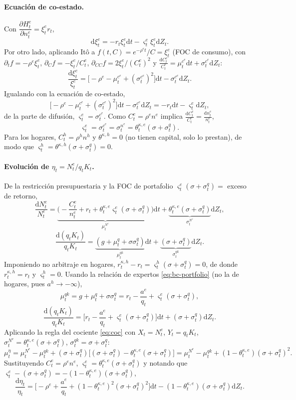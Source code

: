 \documentclass[11pt]{article}
\theoremstyle{definition}
\theoremstyle{remark}
\newcommand{\dd}{\mathrm{d}}
\newcommand{\aE}{a^{e}}
\newcommand{\aH}{a^{h}}
\newcommand{\re}{\rho^{e}}
\newcommand{\rh}{\rho^{h}}
\newcommand{\thke}{\theta_t^{\kappa,e}}
\newcommand{\vsig}{\varsigma}
\newcommand{\sq}{\sigma_t^{q}}
\begin{document}
\paragraph{Ecuación de co-estado.} Con $\dfrac{\partial H_t^{e}}{\partial n_t^{e}}=\xi_t^{e}r_t$,
\[
\dd\xi_t^{e}=-r_t\xi_t^{e}\dd t-\vsig_t^{e}\xi_t^{e}\dd Z_t.
\]
Por otro lado, aplicando Itô a $f(t,C)=e^{-\re t}/C=\xi_t^{e}$ (FOC de consumo), con
$\partial_tf=-\re\xi_t^{e}$, $\partial_Cf=-\xi_t^{e}/C_t^{e}$, $\partial_{CC}f=2\xi_t^{e}/(C_t^{e})^2$ y $\tfrac{\dd C_t^{e}}{C_t^{e}}=\mu_t^{c^{e}}\dd t+\sigma_t^{c^{e}}\dd Z_t$:
\[
\frac{\dd\xi_t^{e}}{\xi_t^{e}}=\big[-\re-\mu_t^{c^{e}}+(\sigma_t^{c^{e}})^2\big]\dd t-\sigma_t^{c^{e}}\dd Z_t.
\]
Igualando con la ecuación de co-estado,
\[
\big[-\re-\mu_t^{c^{e}}+(\sigma_t^{c^{e}})^2\big]\dd t-\sigma_t^{c^{e}}\dd Z_t=-r_t\dd t-\vsig_t^{e}\dd Z_t,
\]
de la parte de difusión, $\vsig_t^{e}=\sigma_t^{c^{e}}$. Como $C_t^{e}=\re n^{e}$ implica $\tfrac{\dd C_t^{e}}{C_t^{e}}=\tfrac{\dd n_t^{e}}{n_t^{e}}$,
\begin{equation}\label{eq:bc-price-risk}
\vsig_t^{e}=\sigma_t^{c^{e}}=\sigma_t^{n^{e}}=\thke(\sigma+\sq).
\end{equation}
Para los hogares, $C_t^{h}=\rh n^{h}$ y $\theta^{\kappa,h}=0$ (no tienen capital, solo lo prestan), de modo que $\vsig_t^{h}=\theta^{\kappa,h}(\sigma+\sq)=0$.

\paragraph{Evolución de $\eta_t=N_t^{e}/q_tK_t$.} De la restricción presupuestaria y la FOC de portafolio $\vsig_t^{e}(\sigma+\sq)=$ exceso de retorno,
\[
\frac{\dd N_t^{e}}{N_t^{e}}=\underbrace{\Big(-\frac{C_t^{e}}{n_t^{e}}+r_t+\thke\vsig_t^{e}(\sigma+\sq)\Big)}_{\mu_t^{N^{e}}}\dd t+\underbrace{\thke(\sigma+\sq)}_{\sigma_t^{N^{e}}}\dd Z_t,
\]
\[
\frac{\dd(q_tK_t)}{q_tK_t}=\underbrace{(g+\mu_t^{q}+\sigma\sq)}_{\mu_t^{qk}}\dd t+\underbrace{(\sigma+\sq)}_{\sigma_t^{qk}}\dd Z_t.
\]
Imponiendo no arbitraje en hogares, $r_t^{\kappa,h}-r_t=\vsig_t^{h}(\sigma+\sq)=0$, de donde $r_t^{\kappa,h}=r_t$ y $\vsig_t^{h}=0$. Usando la relación de expertos \eqref{eq:bc-portfolio} (no la de hogares, pues $\aH\to-\infty$),
\[
\mu_t^{qk}=g+\mu_t^{q}+\sigma\sq=r_t-\frac{\aE}{q_t}+\vsig_t^{e}(\sigma+\sq),
\]
\[
\frac{\dd(q_tK_t)}{q_tK_t}=\Big[r_t-\frac{\aE}{q_t}+\vsig_t^{e}(\sigma+\sq)\Big]\dd t+(\sigma+\sq)\dd Z_t.
\]
Aplicando la regla del cociente \eqref{eq:coc} con $X_t=N_t^{e}$, $Y_t=q_tK_t$, $\sigma_t^{N^{e}}=\thke(\sigma+\sq)$, $\sigma_t^{qk}=\sigma+\sq$:
\[
\mu_t^{\eta}=\mu_t^{N^{e}}-\mu_t^{qk}+(\sigma+\sq)\big[(\sigma+\sq)-\thke(\sigma+\sq)\big]
=\mu_t^{N^{e}}-\mu_t^{qk}+(1-\thke)(\sigma+\sq)^2.
\]
Sustituyendo $C_t^{e}=\re n^{e}$, $\vsig_t^{e}=\thke(\sigma+\sq)$ y notando que $\vsig_t^{e}-(\sigma+\sq)=-(1-\thke)(\sigma+\sq)$,
\begin{equation}\label{eq:bc-eta-1}
\frac{\dd\eta_t}{\eta_t}=\Big[-\re+\frac{\aE}{q_t}+(1-\thke)^2(\sigma+\sq)^2\Big]\dd t-(1-\thke)(\sigma+\sq)\dd Z_t.
\end{equation}
\end{document}
